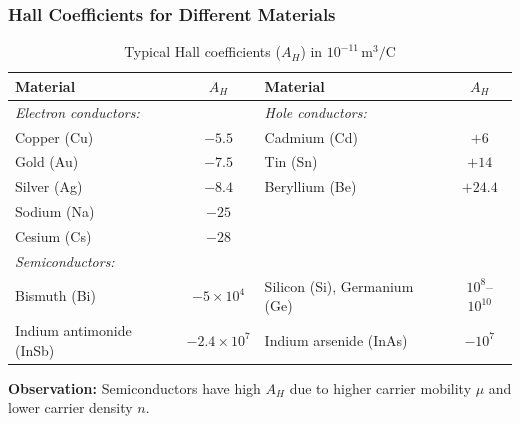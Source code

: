 \begin{frame}
	\frametitle{Hall Coefficients for Different Materials}
    \small
    \begin{table}
        \centering
        \scriptsize
        \begin{tabular}{@{}lc|lc@{}}
            \toprule
            \textbf{Material} & $A_H$ & \textbf{Material} & $A_H$ \\
            \midrule
            \textit{Electron conductors:} & & \textit{Hole conductors:} & \\
            Copper (Cu)      & $-5.5$ & Cadmium (Cd)   & $+6$ \\
            Gold (Au)        & $-7.5$ & Tin (Sn)       & $+14$ \\
            Silver (Ag)      & $-8.4$ & Beryllium (Be) & $+24.4$ \\
            Sodium (Na)      & $-25$  &                & \\
            Cesium (Cs)      & $-28$  &                & \\
            \midrule
            \textit{Semiconductors:} & & & \\
            Bismuth (Bi)             & $-5 \times 10^4$ & Silicon (Si), Germanium (Ge) & $10^8$--$10^{10}$ \\
            Indium antimonide (InSb) & $-2.4 \times 10^7$ & Indium arsenide (InAs) & $-10^7$ \\
            \bottomrule
        \end{tabular}
        \caption{Typical Hall coefficients ($A_H$) in $10^{-11}\,\text{m}^3/\text{C}$}
        \label{tab:hall_coefficients}
    \end{table}
    \textbf{Observation:}
    Semiconductors have high $A_H$ due to higher carrier mobility $\mu$ and lower carrier density $n$.
\end{frame}

